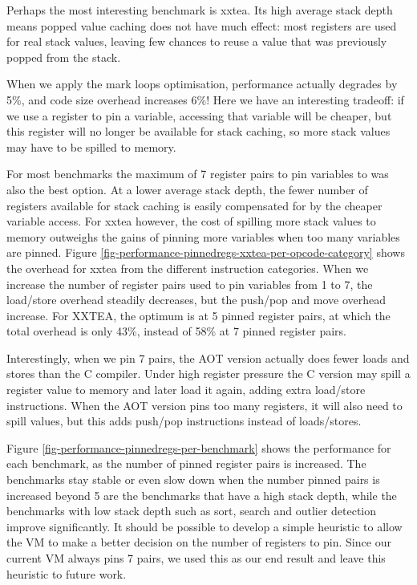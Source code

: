 Perhaps the most interesting benchmark is xxtea. Its high average stack depth means popped value caching does not have much effect: most registers are used for real stack values, leaving few chances to reuse a value that was previously popped from the stack. 

When we apply the mark loops optimisation, performance actually degrades by 5\%, and code size overhead increases 6\%! Here we have an interesting tradeoff: if we use a register to pin a variable, accessing that variable will be cheaper, but this register will no longer be available for stack caching, so more stack values may have to be spilled to memory.

For most benchmarks the maximum of 7 register pairs to pin variables to was also the best option. At a lower average stack depth, the fewer number of registers available for stack caching is easily compensated for by the cheaper variable access. For xxtea however, the cost of spilling more stack values to memory outweighs the gains of pinning more variables when too many variables are pinned. Figure \ref{fig-performance-pinnedregs-xxtea-per-opcode-category} shows the overhead for xxtea from the different instruction categories. When we increase the number of register pairs used to pin variables from 1 to 7, the load/store overhead steadily decreases, but the push/pop and move overhead increase. For XXTEA, the optimum is at 5 pinned register pairs, at which the total overhead is only 43\%, instead of 58\% at 7 pinned register pairs.

 Interestingly, when we pin 7 pairs, the AOT version actually does fewer loads and stores than the C compiler. Under high register pressure the C version may spill a register value to memory and later load it again, adding extra load/store instructions. When the AOT version pins too many registers, it will also need to spill values, but this adds push/pop instructions instead of loads/stores.

Figure \ref{fig-performance-pinnedregs-per-benchmark} shows the performance for each benchmark, as the number of pinned register pairs is increased. The benchmarks stay stable or even slow down when the number pinned pairs is increased beyond 5 are the benchmarks that have a high stack depth, while the benchmarks with low stack depth such as sort, search and outlier detection improve significantly. It should be possible to develop a simple heuristic to allow the VM to make a better decision on the number of registers to pin. Since our current VM always pins 7 pairs, we used this as our end result and leave this heuristic to future work.


